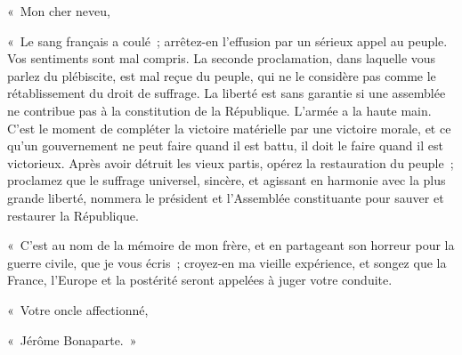 \documentclass[french,twoside]{book} %
\newenvironment{quoteblock}%
  {\begin{quoting}}
  {\end{quoting}}
\newenvironment{quotebar}{%
    \def\FrameCommand{{\color{rubric!10!}\vrule width 0.5em} \hspace{0.9em}}%
    \def\OuterFrameSep{0pt} %
    \MakeFramed {\advance\hsize-\width \FrameRestore}
  }%
  {%
    \endMakeFramed
  }
\renewenvironment{quoteblock}%
  {%
    \savenotes
    \setstretch{0.9}
    \begin{quotebar}
    \smallskip
  }
  {%
    \smallskip
    \end{quotebar}
    \spewnotes
  }
\begin{document}
\begin{quoteblock}
 \noindent « Mon cher neveu,\par
 « Le sang français a coulé ; arrêtez-en l’effusion par un sérieux appel au peuple. Vos sentiments sont mal compris. La seconde proclamation, dans laquelle vous parlez du plébiscite, est mal reçue du peuple, qui ne le considère pas comme le rétablissement du droit de suffrage. La liberté est sans garantie si une assemblée ne contribue pas à la constitution de la République. L’armée a la haute main. C’est le moment de compléter la victoire matérielle par une victoire morale, et ce qu’un gouvernement ne peut faire quand il est battu, il doit le faire quand il est victorieux. Après avoir détruit les vieux partis, opérez la restauration du peuple ; proclamez que le suffrage universel, sincère, et agissant en harmonie avec la plus grande liberté, nommera le président et l’Assemblée constituante pour sauver et restaurer la République.\par
 « C’est au nom de la mémoire de mon frère, et en partageant son horreur pour la guerre civile, que je vous écris ; croyez-en ma vieille expérience, et songez que la France, l’Europe et la postérité seront appelées à juger votre conduite.\par
 « Votre oncle affectionné,\par
 « Jérôme Bonaparte. »
 \end{quoteblock}
\end{document}
